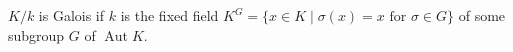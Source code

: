 $K/k$ is Galois if $k$ is the fixed field $K^G = \{x \in K \mid \sigma(x) = x \text{ for } \sigma \in G\}$ of some subgroup $G$ of $\operatorname{Aut} K$.
